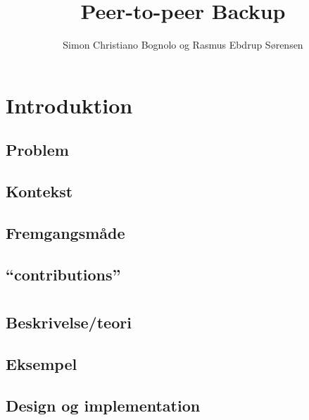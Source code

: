 

\usepackage{biblatex}




\title{Peer-to-peer Backup}
\author{Simon Christiano Bognolo og Rasmus Ebdrup Sørensen}



\frontmatter
\small
\tableofcontents
\normalsize
\newpage


\listoffixmes
 \newpage

\savepagenumber
\mainmatter
\linespread{1.5}
\selectfont

\chapter{Introduktion}
  \section{Problem}	 
  \section{Kontekst}
  \section{Fremgangsmåde}
  \section{``contributions''}

\chapter{\ds}
  \section{Beskrivelse/teori}
  \section{Eksempel}
  \section{Design og implementation}
